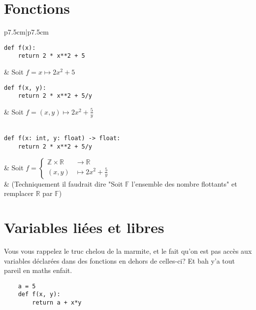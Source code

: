 \documentclass{article}
\newcommand{\R}{{\mathbb R}}
\newcommand{\Z}{{\mathbb Z}}
\begin{document}
\section{Fonctions}

\begin{table}[H]
	\centering
	\begin{tabular}{p{7.5cm}|p{7.5cm}}
\begin{minipage}{0.5\linewidth}
\begin{verbatim}
def f(x):
	return 2 * x**2 + 5
\end{verbatim}
\end{minipage}
       & Soit $f = x\mapsto 2x^2+5$ \\
\begin{minipage}{0.5\linewidth}
\begin{verbatim}
def f(x, y):
	return 2 * x**2 + 5/y
\end{verbatim} 
\end{minipage} 
	   & Soit $f = (x, y)\mapsto 2x^2+\frac{5}{y}$ \\
\\
\begin{minipage}{0.5\linewidth}
\begin{verbatim}
def f(x: int, y: float) -> float:
	return 2 * x**2 + 5/y
\end{verbatim} 
\end{minipage} 
	   & Soit $f = \begin{cases}
		   \Z \times \R &\to \R\\
			(x, y)&\mapsto 2x^2+\frac{5}{y}
		\end{cases}$ \\& {\footnotesize (Techniquement il faudrait dire "Soit $\mathbb{F}$ l'ensemble des nombre flottants" et remplacer $\R$ par $\mathbb{F}$)}
\end{tabular}

\end{table}

\section{Variables liées et libres}

Vous vous rappelez le truc chelou de la marmite, et le fait qu'on est pas accès aux variables déclarées dans des fonctions en dehors de celles-ci? Et bah y'a tout pareil en maths enfait.

\begin{verbatim}
	a = 5
	def f(x, y):
		return a + x*y
\end{verbatim}
\end{document}
